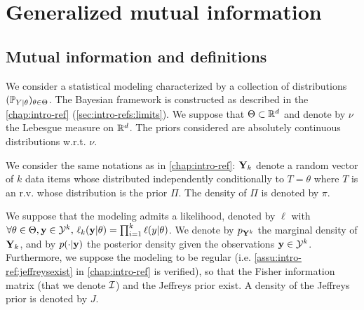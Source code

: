 \section{Generalized mutual information}

\subsection{Mutual information and definitions}


We consider a statistical modeling characterized by a collection of distributions $(\mathbb{P}_{Y|\theta})_{\theta\in\Theta}$. 
The Bayesian framework is constructed as described in the \cref{chap:intro-ref} (\cref{sec:intro-refs:limits}). We suppose that $\Theta\subset\mathbb{R}^d$ and denote by $\nu$ the Lebesgue measure on $\mathbb{R}^d$. 
The priors considered are absolutely continuous distributions w.r.t. $\nu$.

We consider the same notations as in \cref{chap:intro-ref}: $\mathbf{Y}_k$ denote a random vector of $k$ data items whose distributed independently conditionally to $T=\theta$ where $T$ is an r.v. whose distribution is the prior $\varPi$. The density of $\varPi$ is denoted by $\pi$.

We suppose that the modeling admits a likelihood, denoted by $\ell$ with $\forall\theta\in\Theta,\mathbf{y}\in\mathcal{Y}^k,\, \ell_k(\mathbf{y}|\theta)=\prod_{i=1}^k\ell(y|\theta) $. We denote by $p_{\mathbf{Y}^k}$ the marginal density of $\mathbf{Y}_k$, and by $p(\cdot|\mathbf{y})$ the posterior density given the observations $\mathbf{y}\in\mathcal{Y}^k$. %
Furthermore, we suppose the modeling to be regular (i.e. \cref{assu:intro-ref:jeffreysexist} in \cref{chap:intro-ref} is verified), so that the Fisher information matrix (that we denote $\mathcal{I}$) and the Jeffreys prior exist. A density of the Jeffreys prior is denoted by $J$.



